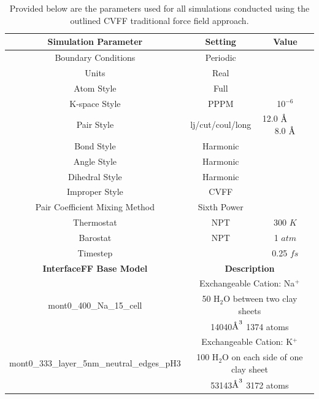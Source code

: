 			\begin{table}
				\centering
				\caption{Provided below are the parameters used for all simulations conducted using the outlined CVFF traditional force field approach.}
				\label{tab:simulation_parameters_CVFF}
				\begin{tabular}{|c|c|c|}
					\hline
					\textbf{Simulation Parameter} & \textbf{Setting} & \textbf{Value}\\
					\hline
					Boundary Conditions & Periodic & \\
					\hline
					Units & Real & \\
					\hline
					Atom Style & Full & \\
					\hline
					\rule{0pt}{2.5ex} K-space Style & PPPM & 10$^{-6}$ \\
					\hline
					\rule{0pt}{2.5ex} Pair Style & lj/cut/coul/long & 12.0 $\text{\normalfont\AA}$ $\qquad$ 8.0 $\text{\normalfont\AA}$ \\
					\hline
					Bond Style & Harmonic & \\
					\hline
					Angle Style & Harmonic & \\
					\hline
					Dihedral Style & Harmonic & \\
					\hline
					Improper Style & CVFF & \\
					\hline
					Pair Coefficient Mixing Method & Sixth Power & \\
					\hline
					Thermostat & NPT & 300 $K$ \\
					\hline
					Barostat & NPT & 1 $atm$ \\
					\hline
					Timestep &  & 0.25 $fs$ \\
					\hline
					\hline
					\textbf{InterfaceFF Base Model} & \multicolumn{2}{c|}{\textbf{Description}} \\
					\hline
					\multirow{3}{*}{mont0\_400\_Na\_15\_cell} & \multicolumn{2}{c|}{Exchangeable Cation: Na$^+$} \\ & \multicolumn{2}{c|}{50 H$_2$O between two clay sheets} \\ & \multicolumn{2}{c|}{14040$\text{\normalfont\AA}^3$ 1374 atoms} \\
					\hline
					\multirow{3}{*}{mont0\_333\_layer\_5nm\_neutral\_edges\_pH3} & \multicolumn{2}{c|}{Exchangeable Cation: K$^+$} \\ & \multicolumn{2}{c|}{100 H$_2$O on each side of one clay sheet} \\ & \multicolumn{2}{c|}{53143$\text{\normalfont\AA}^3$ 3172 atoms} \\
					\hline
					
				\end{tabular}
			\end{table}
			
